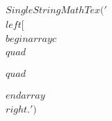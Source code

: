 \documentclass[preview]{standalone}
\begin{document}
\begin{align*}
SingleStringMathTex('\\left[\\begin{array}{c}\\quad \\\\\\quad \\\\\\end{array}\\right.')
\end{align*}
\end{document}
